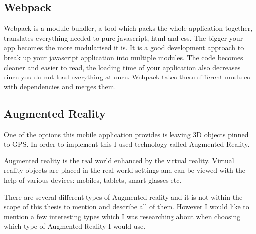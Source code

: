 \documentclass[thesis=M,english]{FITthesis}[2012/10/20]
\begin{document}
 
\subsection{Webpack}
Webpack is a module bundler, a tool which packs the whole application together, translates everything needed to pure javascript, html and css. The bigger your app becomes the more modularised it is. It is a good development approach to break up your javascript application into multiple modules. The code becomes cleaner and easier to read, the loading time of your application also decreases since you do not load everything at once. Webpack takes these different modules with dependencies and merges them.

 
\subsection{Augmented Reality}

One of the options this mobile application provides is leaving 3D objects pinned to GPS. In order to implement this I used technology called  Augmented Reality.

Augmented reality is the real world enhanced by the virtual reality. Virtual reality objects are placed in the real world settings and can be viewed with the help of various devices: mobiles, tablets, smart glasses etc.

There are several different types of Augmented reality and it is not within the scope of this thesis to mention and describe all of them. However I would like to mention a few interesting types which I was researching about when choosing which type of Augmented Reality I would use.
\end{document}
